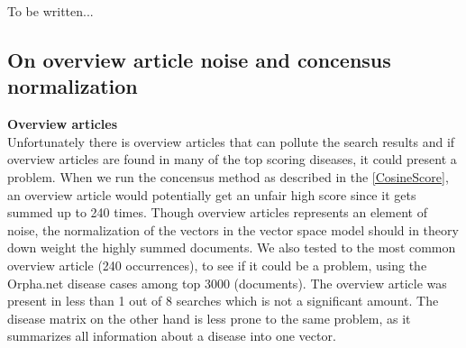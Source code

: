 

To be written...

\subsection{On overview article noise and concensus normalization\label{Overview}}

\textbf{Overview articles}\\
Unfortunately there is overview articles that can pollute the search results and if overview articles are found in many of the top scoring diseases, it could present a problem. When we run the concensus method as described in the \ref{CosineScore}, an overview article would potentially get an unfair high score since it gets summed up to 240 times. Though overview articles represents an element of noise, the normalization of the vectors in the vector space model should in theory down weight the highly summed documents. We also tested to the most common overview article (240 occurrences), to see if it could be a problem, using the Orpha.net disease cases among top 3000 (documents). The overview article was present in less than 1 out of 8 searches which is not a significant amount. The disease matrix on the other hand is less prone to the same problem, as it summarizes all information about a disease into one vector. \\

